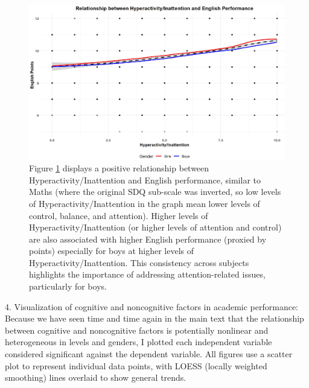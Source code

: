 \documentclass[12pt,a4paper,onecolumn]{article}
\numberwithin{equation}{section}
\begin{document}
\begin{figure}[ht] 
    \centering
    \includegraphics[width=1\linewidth]{production_function_english_hyper.JPG}
    \caption{Figure \ref{fig:hyper_English} displays a positive relationship between Hyperactivity/Inattention and English performance, similar to Maths (where the original SDQ sub-scale was inverted, so low levels of Hyperactivity/Inattention in the graph mean lower levels of control, balance, and attention). Higher levels of Hyperactivity/Inattention (or higher levels of attention and control) are also associated with higher English performance (proxied by points) especially for boys at higher levels of Hyperactivity/Inattention. This consistency across subjects highlights the importance of addressing attention-related issues, particularly for boys.}
    \label{fig:hyper_English}
\end{figure}

4. Visualization of cognitive and noncognitive factors in academic performance: Because we have seen time and time again in the main text that the relationship between cognitive and noncognitive factors is potentially nonlinear and heterogeneous in levels and genders, I plotted each independent variable considered significant against the dependent variable. All figures use a scatter plot to represent individual data points, with LOESS (locally weighted smoothing) lines overlaid to show general trends.

\clearpage
\printbibliography
\end{document}
